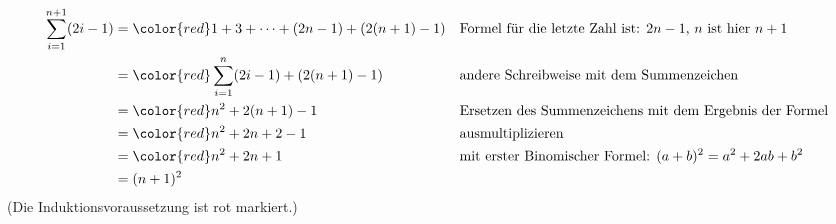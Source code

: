 \documentclass{lehramt-informatik-haupt}
\begin{document}
{\footnotesize
\begin{align*}
\sum^{n+1}_{i=1} (2i-1)
  &= {\color{red}1 + 3 + \cdots + (2n - 1)} + (2(n+1)-1) && \text{Formel für die letzte Zahl ist: } 2n - 1 \text{, } n \text{ ist hier } n + 1\\
  &= {\color{red} \sum^n_{i=1} (2i-1)} + (2(n+1)-1) && \text{andere Schreibweise mit dem Summenzeichen}\\
  &= {\color{red} n^2} + 2(n + 1) - 1 && \text{Ersetzen des Summenzeichens mit dem Ergebnis der Formel}\\
  &= {\color{red} n^2} + 2n + 2 - 1 && \text{ausmultiplizieren}\\
  &= {\color{red} n^2} + 2n + 1 && \text{mit erster Binomischer Formel: } (a+b)^{2}=a^{2}+2ab+b^{2} \\
  &= (n+1)^2
\end{align*}
}
(Die Induktionsvoraussetzung ist rot markiert.)

\literatur
\end{document}
